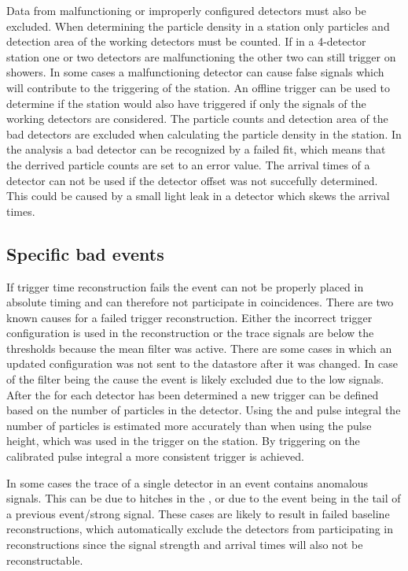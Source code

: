 Data from malfunctioning or improperly configured detectors must also be excluded. When determining the particle density in a station only particles and detection area of the working detectors must be counted. If in a 4-detector station one or two detectors are malfunctioning the other two can still trigger on showers. In some cases a malfunctioning detector can cause false signals which will contribute to the triggering of the station. An offline trigger can be used to determine if the station would also have triggered if only the signals of the working detectors are considered. The particle counts and detection area of the bad detectors are excluded when calculating the particle density in the station. In the analysis a bad detector can be recognized by a failed \mpv fit, which means that the derrived particle counts are set to an error value. The arrival times of a detector can not be used if the detector offset was not succefully determined. This could be caused by a small light leak in a detector which skews the arrival times.


\subsection{Specific bad events}

If trigger time reconstruction fails the event can not be properly placed in absolute \gps timing and can therefore not participate in coincidences. There are two known causes for a failed trigger reconstruction. Either the incorrect trigger configuration is used in the reconstruction or the trace signals are below the thresholds because the mean filter was active. There are some cases in which an updated configuration was not sent to the datastore after it was changed. In case of the filter being the cause the event is likely excluded due to the low signals. After the \mpv for each detector has been determined a new trigger can be defined based on the number of particles in the detector. Using the \mpv and pulse integral the number of particles is estimated more accurately than when using the pulse height, which was used in the trigger on the station. By triggering on the calibrated pulse integral a more consistent trigger is achieved.

In some cases the trace of a single detector in an event contains anomalous signals. This can be due to hitches in the \pmt, or due to the event being in the tail of a previous event/strong signal. These cases are likely to result in failed baseline reconstructions, which automatically exclude the detectors from participating in reconstructions since the signal strength and arrival times will also not be reconstructable.


